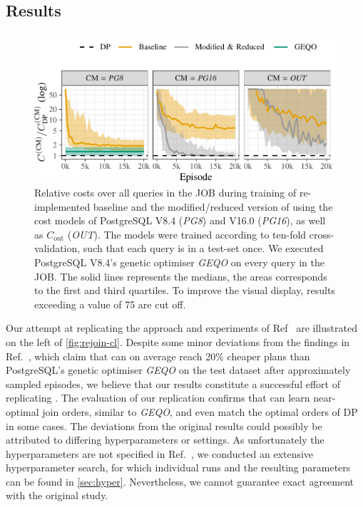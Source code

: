 \documentclass[10pt, conference]{IEEEtran}
\begin{document}
\subsection{Results}
\begin{figure}
  \includegraphics{img-gen/convergence_rejoin_base.pdf}\vspace*{-0.5em}
  \caption{Relative costs over all queries in the JOB during training of re-implemented baseline and the modified/reduced version of \rj using the cost models of PostgreSQL V8.4 (\emph{PG8}) and V16.0 (\emph{PG16}), as well as $C_{\text{out}}$ (\emph{OUT}). The models were trained according to ten-fold cross-validation, such that each query is in a test-set once. We executed PostgreSQL V8.4's genetic optimiser \emph{GEQO} on every query in the JOB. The solid lines represents the medians, the areas corresponds to the first and third quartiles. To improve the visual display, results exceeding a value of 75 are cut off.}
  \label{fig:rejoin-cl}
\end{figure}

Our attempt at replicating the approach and experiments of Ref~\cite{marcus18} are illustrated on the left of \autoref{fig:rejoin-cl}.
Despite some minor deviations from the findings in Ref.~\cite{marcus18}, which claim that \rj can on average reach 20\% cheaper plans than PostgreSQL's genetic optimiser \emph{GEQO} on the test dataset after approximately  sampled episodes, we believe that our results constitute a successful effort of replicating \rj.
The evaluation of our replication confirms that \rj can learn near-optimal join orders, similar to \emph{GEQO}, and even match the optimal orders of DP in some cases.
The deviations from the original results could possibly be attributed to differing hyperparameters or settings.
As unfortunately the hyperparameters are not specified in Ref.~\cite{marcus18}, we conducted an extensive hyperparameter search, for which individual runs and the resulting parameters can be found in \autoref{sec:hyper}.
Nevertheless, we cannot guarantee exact agreement with the original study.
\end{document}
